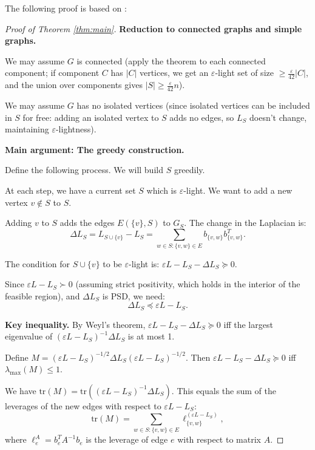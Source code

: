 \documentclass[12pt]{article}
\begin{document}
The following proof is based on \cite{Spielman2015}:

\begin{proof}[Proof of Theorem \ref{thm:main}]

\textbf{Reduction to connected graphs and simple graphs.}

We may assume $G$ is connected (apply the theorem to each connected component; if component $C$ has $|C|$ vertices, we get an $\varepsilon$-light set of size $\geq \frac{\varepsilon}{42}|C|$, and the union over components gives $|S| \geq \frac{\varepsilon}{42}n$).

We may assume $G$ has no isolated vertices (since isolated vertices can be included in $S$ for free: adding an isolated vertex to $S$ adds no edges, so $L_S$ doesn't change, maintaining $\varepsilon$-lightness).

\textbf{Main argument: The greedy construction.}

Define the following process. We will build $S$ greedily.

At each step, we have a current set $S$ which is $\varepsilon$-light. We want to add a new vertex $v \notin S$ to $S$.

Adding $v$ to $S$ adds the edges $E(\{v\}, S)$ to $G_S$. The change in the Laplacian is:
\[
\Delta L_S = L_{S \cup \{v\}} - L_S = \sum_{w \in S: \{v,w\} \in E} b_{\{v,w\}} b_{\{v,w\}}^T.
\]

The condition for $S \cup \{v\}$ to be $\varepsilon$-light is: $\varepsilon L - L_S - \Delta L_S \succeq 0$.

Since $\varepsilon L - L_S \succ 0$ (assuming strict positivity, which holds in the interior of the feasible region), and $\Delta L_S$ is PSD, we need:
\[
\Delta L_S \preceq \varepsilon L - L_S.
\]

\textbf{Key inequality.} By Weyl's theorem, $\varepsilon L - L_S - \Delta L_S \succeq 0$ iff the largest eigenvalue of $(\varepsilon L - L_S)^{-1} \Delta L_S$ is at most 1.

Define $M = (\varepsilon L - L_S)^{-1/2} \Delta L_S (\varepsilon L - L_S)^{-1/2}$. Then $\varepsilon L - L_S - \Delta L_S \succeq 0$ iff $\lambda_{\max}(M) \leq 1$.

We have $\mathrm{tr}(M) = \mathrm{tr}((\varepsilon L - L_S)^{-1} \Delta L_S)$. This equals the sum of the leverages of the new edges with respect to $\varepsilon L - L_S$:
\[
\mathrm{tr}(M) = \sum_{w \in S: \{v,w\} \in E} \ell_{\{v,w\}}^{(\varepsilon L - L_S)},
\]
where $\ell_e^A = b_e^T A^{-1} b_e$ is the leverage of edge $e$ with respect to matrix $A$.


\end{proof}
\end{document}
